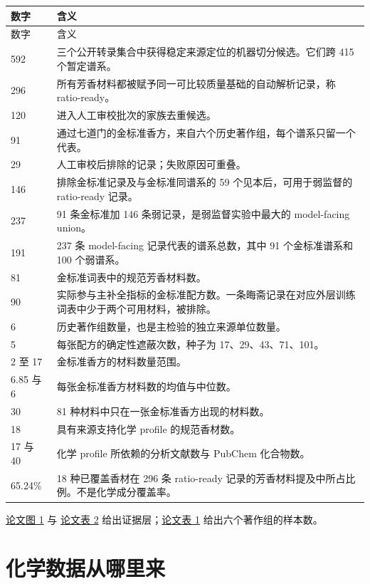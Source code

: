 \documentclass[UTF8,11pt,openany,fontset=none]{ctexbook}
\newcommand{\paperpage}[2]{\href{run:xiangji_source_stable_v3.pdf\#page=#1}{#2}}
\newcommand{\papertable}[2]{\paperpage{#2}{论文表 #1}}
\newcommand{\paperfigure}[2]{\paperpage{#2}{论文图 #1}}
\begin{document}
\begin{longtable}{p{}p{}}
\toprule
数字 & 含义\\
\midrule
\endfirsthead
\toprule
数字 & 含义\\
\midrule
\endhead
592 & 三个公开转录集合中获得稳定来源定位的机器切分候选。它们跨 415 个暂定谱系。\\
296 & 所有芳香材料都被赋予同一可比较质量基础的自动解析记录，称 ratio-ready。\\
120 & 进入人工审校批次的家族去重候选。\\
91 & 通过七道门的金标准香方，来自六个历史著作组，每个谱系只留一个代表。\\
29 & 人工审校后排除的记录；失败原因可重叠。\\
146 & 排除金标准记录及与金标准同谱系的 59 个见本后，可用于弱监督的 ratio-ready 记录。\\
237 & 91 条金标准加 146 条弱记录，是弱监督实验中最大的 model-facing union。\\
191 & 237 条 model-facing 记录代表的谱系总数，其中 91 个金标准谱系和 100 个弱谱系。\\
81 & 金标准词表中的规范芳香材料数。\\
90 & 实际参与主补全指标的金标准配方数。一条晦斋记录在对应外层训练词表中少于两个可用材料，被排除。\\
6 & 历史著作组数量，也是主检验的独立来源单位数量。\\
5 & 每张配方的确定性遮蔽次数，种子为 17、29、43、71、101。\\
2 至 17 & 金标准香方的材料数量范围。\\
6.85 与 6 & 每张金标准香方材料数的均值与中位数。\\
30 & 81 种材料中只在一张金标准香方出现的材料数。\\
18 & 具有来源支持化学 profile 的规范香材数。\\
17 与 40 & 化学 profile 所依赖的分析文献数与 PubChem 化合物数。\\
65.24\% & 18 种已覆盖香材在 296 条 ratio-ready 记录的芳香材料提及中所占比例。不是化学成分覆盖率。\\
\bottomrule
\end{longtable}

\paperfigure{1}{4} 与 \papertable{2}{4} 给出证据层；\papertable{1}{3} 给出六个著作组的样本数。

\chapter{化学数据从哪里来}
\end{document}
